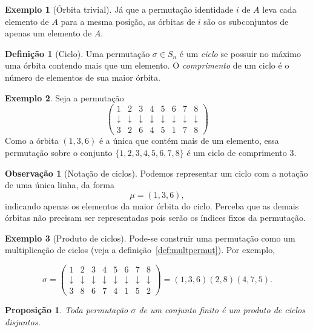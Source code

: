 \documentclass[a4paper,12pt]{report}
\theoremstyle{plain}
\newtheorem{proposicao}{Proposição}[section]
\theoremstyle{definition}
\newtheorem{definicao}{Definição}[section]
\newtheorem{observacao}{Observação}[section]
\newtheorem{exemplo}{Exemplo}[section]
\begin{document}
	\begin{exemplo}[Órbita trivial]
		Já que a permutação identidade $i$ de $A$ leva cada elemento de $A$ para a mesma posição, as órbitas de $i$ são os subconjuntos de apenas um elemento de $A$.
	\end{exemplo}
	
	\begin{definicao}[Ciclo]
		Uma permutação $\sigma\in S_n$ é um \emph{ciclo} se possuir no máximo uma órbita contendo mais que um elemento. O \emph{comprimento} de um ciclo é o número de elementos de sua maior órbita.
	\end{definicao}
	
	\begin{exemplo}
		Seja a permutação 
		$$
		\begin{pmatrix}
			1 & 2 & 3 & 4 & 5 & 6 & 7 & 8\\
			\downarrow & \downarrow & \downarrow & \downarrow & \downarrow & \downarrow & \downarrow & \downarrow\\
			3 & 2 & 6 & 4 & 5 & 1 & 7 & 8
		\end{pmatrix}
		$$
		Como a órbita $(1,3,6)$ é a única que contém mais de um elemento, essa permutação sobre o conjunto $\{1,2,3,4,5,6,7,8\}$ é um ciclo de comprimento 3.
	\end{exemplo}
	
	\begin{observacao}[Notação de ciclos]
		Podemos representar um ciclo com a notação de uma única linha, da forma $$\mu = (1,3,6),$$ indicando apenas os elementos da maior órbita do ciclo. Perceba que as demais órbitas não precisam ser representadas pois serão os índices fixos da permutação.
	\end{observacao}
	
	\begin{exemplo}[Produto de ciclos]
		Pode-se construir uma permutação como um multiplicação de ciclos (veja a definição~\ref{def:multpermut}). Por exemplo,
		
		$$
		\sigma = 
		\begin{pmatrix}
			1 & 2 & 3 & 4 & 5 & 6 & 7 & 8\\
			\downarrow & \downarrow & \downarrow & \downarrow & \downarrow & \downarrow & \downarrow & \downarrow\\
			3 & 8 & 6 & 7 & 4 & 1 & 5 & 2
		\end{pmatrix}
		= (1,3,6)(2,8)(4,7,5).
		$$
	\end{exemplo}
	
	\begin{proposicao}
		Toda permutação $\sigma$ de um conjunto finito é um produto de ciclos disjuntos.
	\end{proposicao}
	
\end{document}
